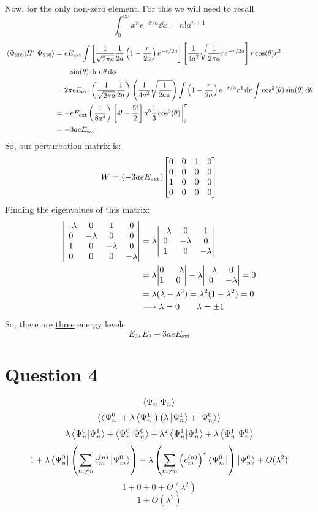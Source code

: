 \documentclass[11pt]{article}
\begin{document}
\begin{enumerate}[label=\alph*)]
Now, for the only non-zero element. For this we will need to recall 
\[\int_0^\infty x^n e^{-x/a}\dd{x} = n! a^{n+1}\]
\begin{align*}
\mel{\Psi_{200}}{H^\prime}{\Psi_{210}} & = eE_{\text{ext}}\int \left[\frac{1}{\sqrt{2\pi a}}\frac{1}{2a}\left(1-\frac{r}{2a}\right)e^{-r/2a}\right]\left[\frac{1}{4a^2}\sqrt{\frac{1}{2\pi a}}re^{-r/2a}\right]r\cos(\theta)r^2 \\
& \qquad \sin(\theta)\dd{r}\dd{\theta}\dd{\phi}\\
& = 2\pi eE_{\text{ext}}\left(\frac{1}{\sqrt{2\pi a}}\frac{1}{2a}\right)\left(\frac{1}{4a^2}\sqrt{\frac{1}{2a\pi}}\right)\int\left(1-\frac{r}{2a}\right)e^{-r/a}r^4 \dd{r} \int\cos[2](\theta)\sin(\theta)\dd{\theta}\\
& = -eE_{\text{ext}}\left(\frac{1}{8a^4}\right)\left[4! -\frac{5!}{2}\right]a^5 \frac{1}{3}\cos[3](\theta)\eval_0^\pi\\
&= -3aeE_{\text{ext}}
\end{align*}
So, our perturbation matrix is:
\[W = (-3aeE_{\text{ext}})\mqty[0&0&1&0\\0&0&0&0\\1&0&0&0\\0&0&0&0]\]
Finding the eigenvalues of this matrix:
\begin{align*}
\mqty|-\lambda&0&1&0\\0&-\lambda&0&0\\1&0&-\lambda&0\\0&0&0&-\lambda| & = \lambda\mqty|-\lambda& 0 & 1 \\ 0 & -\lambda & 0 \\ 1 & 0 & -\lambda|\\
& = \lambda\mqty|0 & -\lambda \\ 1 & 0| -\lambda\mqty|-\lambda & 0 \\ 0 & -\lambda| = 0\\
& = \lambda(\lambda-\lambda^3) = \lambda^2(1-\lambda^2) = 0\\
& \longrightarrow \lambda = 0 \qquad \lambda = \pm 1
\end{align*}
So, there are \underline{three} energy levels:
\[\boxed{E_2, E_2 \pm 3aeE_{\text{ext}}}\]

\end{enumerate}

\newpage

\section*{Question 4}
\[\braket{\Psi_n}{\Psi_n}\]
\[\left(\bra{\Psi_n^0} + \lambda\bra{\Psi_n^1}\right)\left(\lambda\ket{\Psi_n^1} + \ket{\Psi_n^0}\right)\]
\[\lambda\braket{\Psi_n^0}{\Psi_n^1} + \braket{\Psi_n^0}{\Psi_n^0} + \lambda^2\braket{\Psi^1_n}{\Psi_n^1} + \lambda\braket{\Psi_n^1}{\Psi_n^0}\]
\[1 + \lambda\bra{\Psi_n^0}\left(\sum_{m\neq n} c_m^{(n)}\ket{\Psi_m^0}\right) + \lambda \left(\sum_{m\neq n} \left(c_m^{(n)}\right)^*\bra{\Psi_m^0}\right)\ket{\Psi_n^0} + O(\lambda^2)\]
\[1 + 0 + 0 + O(\lambda^2)\]
\[1 + O(\lambda^2)\]
\end{document}
